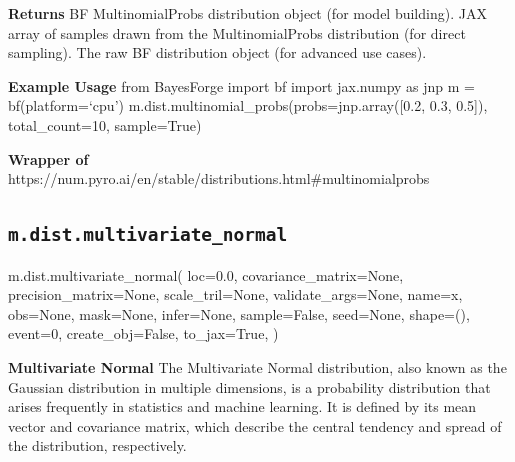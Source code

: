 \documentclass[
  letterpaper,
  DIV=11,
  numbers=noendperiod]{scrartcl}
\newenvironment{Shaded}{\begin{snugshade}}{\end{snugshade}}
\newcommand{\DecValTok}[1]{\textcolor[rgb]{0.68,0.00,0.00}{#1}}
\newcommand{\FloatTok}[1]{\textcolor[rgb]{0.68,0.00,0.00}{#1}}
\newcommand{\NormalTok}[1]{\textcolor[rgb]{0.00,0.23,0.31}{#1}}
\newcommand{\OperatorTok}[1]{\textcolor[rgb]{0.37,0.37,0.37}{#1}}
\newcommand{\StringTok}[1]{\textcolor[rgb]{0.13,0.47,0.30}{#1}}
\newcommand{\VariableTok}[1]{\textcolor[rgb]{0.07,0.07,0.07}{#1}}
\begin{document}
\textbf{Returns} BF MultinomialProbs distribution object (for model
building). JAX array of samples drawn from the MultinomialProbs
distribution (for direct sampling). The raw BF distribution object (for
advanced use cases).

\textbf{Example Usage} from BayesForge import bf import jax.numpy as jnp
m = bf(platform=`cpu') m.dist.multinomial\_probs(probs=jnp.array({[}0.2,
0.3, 0.5{]}), total\_count=10, sample=True)

\textbf{Wrapper of}
https://num.pyro.ai/en/stable/distributions.html\#multinomialprobs

\subsection{\texorpdfstring{\texttt{m.dist.multivariate\_normal}}{m.dist.multivariate\_normal}}\label{multivariate_normal}

\begin{Shaded}
\begin{Highlighting}[]
\NormalTok{m.dist.multivariate\_normal(}
\NormalTok{    loc}\OperatorTok{=}\FloatTok{0.0}\NormalTok{,}
\NormalTok{    covariance\_matrix}\OperatorTok{=}\VariableTok{None}\NormalTok{,}
\NormalTok{    precision\_matrix}\OperatorTok{=}\VariableTok{None}\NormalTok{,}
\NormalTok{    scale\_tril}\OperatorTok{=}\VariableTok{None}\NormalTok{,}
\NormalTok{    validate\_args}\OperatorTok{=}\VariableTok{None}\NormalTok{,}
\NormalTok{    name}\OperatorTok{=}\StringTok{\textquotesingle{}x\textquotesingle{}}\NormalTok{,}
\NormalTok{    obs}\OperatorTok{=}\VariableTok{None}\NormalTok{,}
\NormalTok{    mask}\OperatorTok{=}\VariableTok{None}\NormalTok{,}
\NormalTok{    infer}\OperatorTok{=}\VariableTok{None}\NormalTok{,}
\NormalTok{    sample}\OperatorTok{=}\VariableTok{False}\NormalTok{,}
\NormalTok{    seed}\OperatorTok{=}\VariableTok{None}\NormalTok{,}
\NormalTok{    shape}\OperatorTok{=}\NormalTok{(),}
\NormalTok{    event}\OperatorTok{=}\DecValTok{0}\NormalTok{,}
\NormalTok{    create\_obj}\OperatorTok{=}\VariableTok{False}\NormalTok{,}
\NormalTok{    to\_jax}\OperatorTok{=}\VariableTok{True}\NormalTok{,}
\NormalTok{)}
\end{Highlighting}
\end{Shaded}

\textbf{Multivariate Normal} The Multivariate Normal distribution, also
known as the Gaussian distribution in multiple dimensions, is a
probability distribution that arises frequently in statistics and
machine learning. It is defined by its mean vector and covariance
matrix, which describe the central tendency and spread of the
distribution, respectively.
\end{document}
